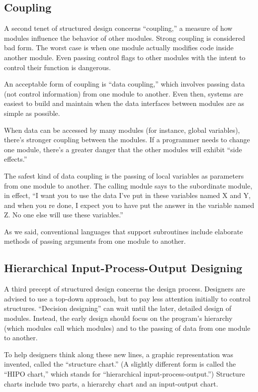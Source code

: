 \subsection{Coupling}

A second tenet of structured design concerns {}``coupling,'' a measure
of how modules influence the behavior of other modules. Strong coupling
is considered bad form. The worst case is when one module actually
modifies code inside another module. Even passing control flags to
other modules with the intent to control their function is dangerous.

An acceptable form of coupling is {}``data coupling,'' which involves
passing data (not control information) from one module to another.
Even then, systems are easiest to build and maintain when the data
interfaces between modules are as simple as possible.

When data can be accessed by many modules (for instance, global variables),
there's stronger coupling between the modules. If a programmer needs
to change one module, there's a greater danger that the other modules
will exhibit {}``side effects.''

The safest kind of data coupling is the passing of local variables
as parameters from one module to another. The calling module says
to the subordinate module, in effect, {}``I want you to use the data
I've put in these variables named X and Y, and when you re done, I
expect you to have put the answer in the variable named Z. No one
else will use these variables.''

As we said, conventional languages that support subroutines include
elaborate methods of passing arguments from one module to another.


\subsection{Hierarchical Input-Process-Output Designing}

A third precept of structured design concerns the design process.
Designers are advised to use a top-down approach, but to pay less
attention initially to control structures. {}``Decision designing''
can wait until the later, detailed design of modules. Instead, the
early design should focus on the program's hierarchy (which modules
call which modules) and to the passing of data from one module to
another.

To help designers think along these new lines, a graphic representation
was invented, called the {}``structure chart.'' (A slightly different
form is called the {}``HIPO chart,'' which stands for {}``hierarchical
input-process-output.'') Structure charts include two parts, a hierarchy
chart and an input-output chart.


